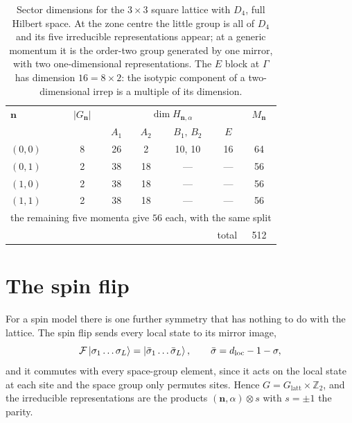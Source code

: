 \documentclass[12pt]{article}
\newcommand{\Glatt}{G_{\mathrm{latt}}}
\newcommand{\Gk}{G_{\mathbf{n}}}
\begin{document}
\begin{table}[t]
\centering
\begin{tabular}{lcccccc}
\toprule
$\mathbf{n}$ & $|\Gk|$ & \multicolumn{4}{c}{$\dim H_{\mathbf{n},\alpha}$} & $M_{\mathbf{n}}$ \\
 & & $A_1$ & $A_2$ & $B_1,\,B_2$ & $E$ & \\
\midrule
$(0,0)$ & 8 & 26 & 2 & 10, 10 & 16 & 64 \\
$(0,1)$ & 2 & 38 & 18 & --- & --- & 56 \\
$(1,0)$ & 2 & 38 & 18 & --- & --- & 56 \\
$(1,1)$ & 2 & 38 & 18 & --- & --- & 56 \\
\multicolumn{7}{c}{\footnotesize the remaining five momenta give $56$ each, with the same split}\\
\midrule
\multicolumn{6}{r}{total} & 512 \\
\bottomrule
\end{tabular}
\caption{Sector dimensions for the $3\times3$ square lattice with $D_4$, full
Hilbert space. At the zone centre the little group is all of $D_4$ and its five
irreducible representations appear; at a generic momentum it is the order-two
group generated by one mirror, with two one-dimensional representations. The
$E$ block at $\Gamma$ has dimension $16 = 8\times2$: the isotypic component of a
two-dimensional irrep is a multiple of its dimension.}
\label{tab:sectors}
\end{table}

\section{The spin flip}\label{sec:spin}

For a spin model there is one further symmetry that has nothing to do with the
lattice. The spin flip sends every local state to its mirror image,
\begin{equation}
  \mathcal{F}\ket{\sigma_1\dots\sigma_L} = \ket{\bar\sigma_1\dots\bar\sigma_L},
  \qquad \bar\sigma = d_{\mathrm{loc}}-1-\sigma ,
  \label{eq:flip}
\end{equation}
and it commutes with every space-group element, since it acts on the local state
at each site and the space group only permutes sites. Hence
$G = \Glatt\times\mathbb{Z}_2$, and the irreducible representations are the
products $(\mathbf{n},\alpha)\otimes s$ with $s = \pm1$ the parity.
\end{document}
